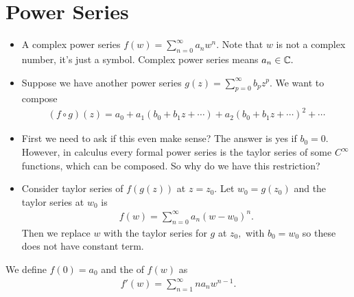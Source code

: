 \documentclass[a4paper,12pt]{article}
\begin{document}
\section{Power Series}
\begin{itemize}
    \item A complex power series $f(w)=\sum_{n=0}^\infty a_nw^n.$ Note that $w$ is not a complex number, it's just a symbol. Complex power series means $a_n\in\mathbb{C}.$
    \item Suppose we have another power series $g(z)=\sum_{p=0}^\infty b_pz^p.$ We want to compose \begin{align}
        (f\circ g)(z)=a_0+a_1(b_0+b_1z+\cdots)+a_2(b_0+b_1z+\cdots)^2+\cdots
    \end{align} 
    \item First we need to ask if this even make sense? The answer is yes if $b_0=0.$ However, in calculus every formal power series is the taylor series of some $C^\infty$ functions, which can be composed. So why do we have this restriction?
    \item Consider taylor series of $f(g(z))$ at $z=z_0.$ Let $w_0=g(z_0)$ and the taylor series at $w_0$ is \begin{align}
        f(w)=\sum_{n=0}^\infty a_n(w-w_0)^n.
    \end{align}
    Then we replace $w$ with the taylor series for $g$ at $z_0,$ with $b_0=w_0$ so these does not have constant term.
\end{itemize}
\begin{definition}
    We define $f(0)=a_0$ and the  of $f(w)$ as \begin{align}
        f'(w)=\sum_{n=1}^\infty na_nw^{n-1}.
    \end{align}
\end{definition}
\end{document}

